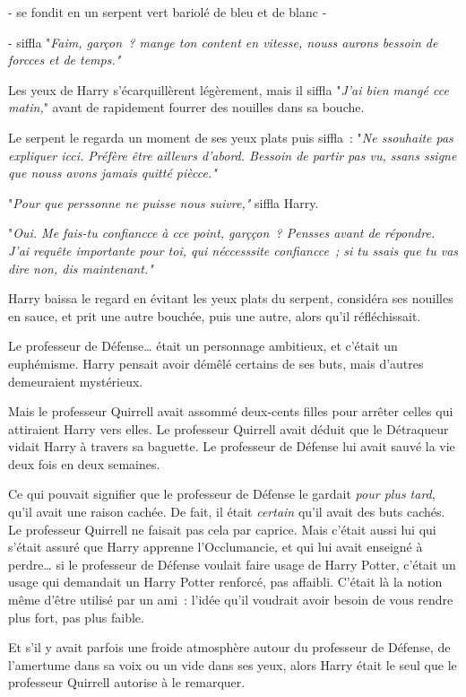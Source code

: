 - se fondit en un serpent vert bariolé de bleu et de blanc -

- siffla "\emph{Faim, garçon~? mange ton content en vitesse, nouss aurons bessoin de forcces et de temps."}

Les yeux de Harry s'écarquillèrent légèrement, mais il siffla "\emph{J'ai bien mangé cce matin,}" avant de rapidement fourrer des nouilles dans sa bouche.

Le serpent le regarda un moment de ses yeux plats puis siffla~: "\emph{Ne ssouhaite pas expliquer icci. Préfère être ailleurs d'abord. Bessoin de partir pas vu, ssans ssigne que nouss avons jamais quitté piècce."}

"\emph{Pour que perssonne ne puisse nous suivre,"} siffla Harry.

"\emph{Oui. Me fais-tu confiancce à cce point, garççon~? Pensses avant de répondre. J'ai requête importante pour toi, qui néccesssite confiancce~; si tu ssais que tu vas dire non, dis maintenant."}

Harry baissa le regard en évitant les yeux plats du serpent, considéra ses nouilles en sauce, et prit une autre bouchée, puis une autre, alors qu'il réfléchissait.

Le professeur de Défense… était un personnage ambitieux, et c'était un euphémisme. Harry pensait avoir démêlé certains de ses buts, mais d'autres demeuraient mystérieux.

Mais le professeur Quirrell avait assommé deux-cents filles pour arrêter celles qui attiraient Harry vers elles. Le professeur Quirrell avait déduit que le Détraqueur vidait Harry à travers sa baguette. Le professeur de Défense lui avait sauvé la vie deux fois en deux semaines.

Ce qui pouvait signifier que le professeur de Défense le gardait \emph{pour plus tard}, qu'il avait une raison cachée. De fait, il était \emph{certain} qu'il avait des buts cachés. Le professeur Quirrell ne faisait pas cela par caprice. Mais c'était aussi lui qui s'était assuré que Harry apprenne l'Occlumancie, et qui lui avait enseigné à perdre… si le professeur de Défense voulait faire usage de Harry Potter, c'était un usage qui demandait un Harry Potter renforcé, pas affaibli. C'était là la notion même d'être utilisé par un ami~: l'idée qu'il voudrait avoir besoin de vous rendre plus fort, pas plus faible.

Et s'il y avait parfois une froide atmosphère autour du professeur de Défense, de l'amertume dans sa voix ou un vide dans ses yeux, alors Harry était le seul que le professeur Quirrell autorise à le remarquer.

